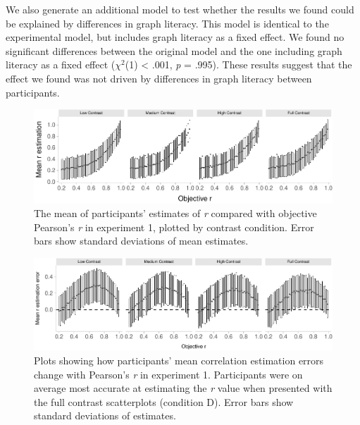 \documentclass[preprint, 3p,
authoryear]{elsarticle} %
\begin{document}
We also generate an additional model to test whether the results we
found could be explained by differences in graph literacy. This model is
identical to the experimental model, but includes graph literacy as a
fixed effect. We found no significant differences between the original
model and the one including graph literacy as a fixed effect
(\(\chi^2\)(1) \textless{} .001, \emph{p} = .995). These results suggest
that the effect we found was not driven by differences in graph literacy
between participants.

\begin{figure}

{\centering \includegraphics{contrast_and_scatterplots_files/figure-latex/e1-error-plot-1} 

}

\caption{\label{e1-error-plot}The mean of participants' estimates of \textit{r} compared with objective Pearson's \textit{r} in experiment 1, plotted by contrast condition. Error bars show standard deviations of mean estimates.}\label{fig:e1-error-plot}
\end{figure}

\begin{figure}
\includegraphics[width=1\linewidth]{contrast_and_scatterplots_files/figure-latex/changes-with-r-e1-1} \caption{\label{e1-changes-plot}Plots showing how participants' mean correlation estimation errors change with Pearson's \textit{r} in experiment 1. Participants were on average most accurate at estimating the \textit{r} value when presented with the full contrast scatterplots (condition D). Error bars show standard deviations of estimates.}\label{fig:changes-with-r-e1}
\end{figure}
\end{document}
